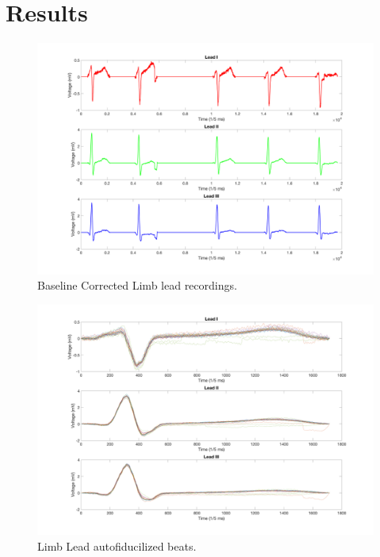 \documentclass[12pt]{article}
\begin{document}
\section{Results}


\begin{figure}[H]
	
	\centering
	\includegraphics[width = .95\textwidth]{Figures/LimLeads1.png}
	\caption{Baseline Corrected Limb lead recordings.}
	\label{fig:Limb1}
\end{figure}

\begin{figure}[H]
	
	\centering
	\includegraphics[width = .95\textwidth]{Figures/LimLeads2.png}
	\caption{Limb Lead autofiducilized beats.}
	\label{fig:Limb2}
\end{figure}
\end{document}
